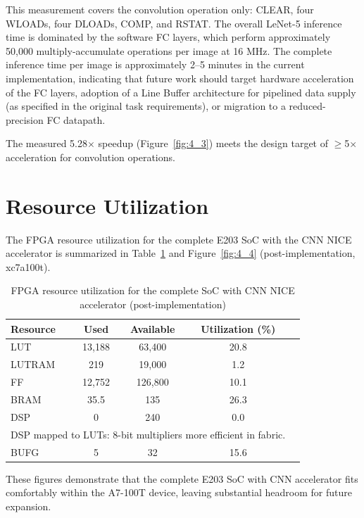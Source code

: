 This measurement covers the convolution operation only: CLEAR, four WLOADs, four DLOADs, COMP, and RSTAT. The overall LeNet-5 inference time is dominated by the software FC layers, which perform approximately 50,000 multiply-accumulate operations per image at 16 MHz. The complete inference time per image is approximately 2--5 minutes in the current implementation, indicating that future work should target hardware acceleration of the FC layers, adoption of a Line Buffer architecture for pipelined data supply (as specified in the original task requirements), or migration to a reduced-precision FC datapath.

The measured 5.28$\times$ speedup (Figure~\ref{fig:4_3}) meets the design target of $\geq$5$\times$ acceleration for convolution operations.

\section{Resource Utilization}\label{sec:4_6}

The FPGA resource utilization for the complete E203 SoC with the CNN NICE accelerator is summarized in Table~\ref{tab:4_6} and Figure~\ref{fig:4_4} (post-implementation, \mbox{xc7a100t}).


\begin{table}[htbp]
\centering
\caption[FPGA resource utilization for the complete SoC]{FPGA resource utilization for the complete SoC with CNN NICE accelerator (post-implementation)}
\label{tab:4_6}
\begin{tabular}{lcccc}
\hline
Resource & Used & Available & Utilization (\%) \\ \hline\hline
LUT & 13,188 & 63,400 & 20.8 \\ \hline
LUTRAM & 219 & 19,000 & 1.2 \\ \hline
FF & 12,752 & 126,800 & 10.1 \\ \hline
BRAM & 35.5 & 135 & 26.3 \\ \hline
DSP & 0 & 240 & 0.0\tabularnewline
\multicolumn{4}{l}{\footnotesize DSP mapped to LUTs: 8-bit multipliers more efficient in fabric.} \\ \hline
BUFG & 5 & 32 & 15.6 \\ \hline
\end{tabular}
\end{table}

These figures demonstrate that the complete E203 SoC with CNN accelerator fits comfortably within the A7-100T device, leaving substantial headroom for future expansion.


